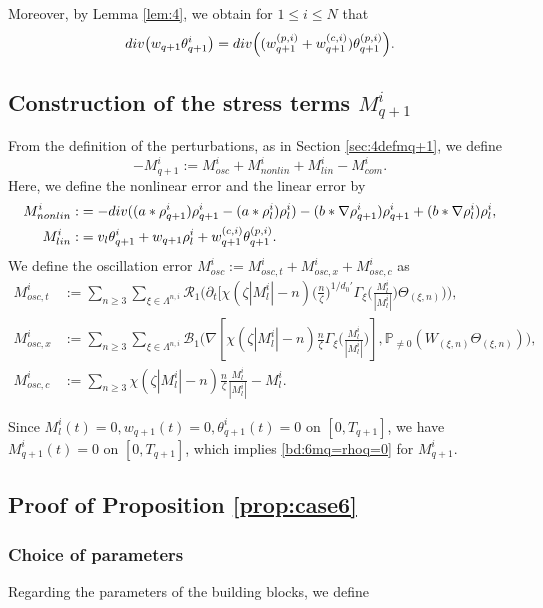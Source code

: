 \documentclass[10pt,a4paper]{amsart}
\numberwithin{equation}{section}
\def\({{\Big(}}
\def\){{\Big)}}
\def\geq{\geqslant}
\def\leq{\leqslant}
\def\div{\mathord{{\rm div}}}
\def\({{\Big(}}
\def\){{\Big)}}
\def\geq{\geqslant}
\def\leq{\leqslant}
\def\div{\mathord{{\rm div}}}
\begin{document}
Moreover, by Lemma \ref{lem:4}, we obtain for
$
1\leq i\leq N 
$
that
\begin{align}
\div\bigl(
w_{q+1}\theta_{q+1}^i
\bigr)
=
\div\(
(w_{q+1}^{(p,i)}+w_{q+1}^{(c,i)})
\theta_{q+1}^{(p,i)}
\).\notag
\end{align}


\subsection{Construction of the stress terms $M^{i}_{q+1}$}\label{sec:6defmq+1}

From  the definition of the perturbations, as in Section \ref{sec:4defmq+1},  
we   define 
 $$-{M}^i_{q+1}:=M^{i}_{osc}+M^{i}_{nonlin}+M^{i}_{lin}-M_{com}^i.$$
 Here, we define the nonlinear error and the linear error   by
\begin{align*} 
M^{i}_{nonlin}:&= -\div( (a*\rho^{i}_{q+1}) \rho^{i}_{q+1}-(a*\rho^{i}_{l}) \rho^{i}_{l} )-(b*\nabla\rho_{q+1}^i)\rho_{q+1}^i+(b*\nabla\rho_{l}^i)\rho_{l}^i,\\
M^{i}_{lin}:&=v_l\theta^{i}_{q+1}+w_{q+1}\rho^{i}_l+w_{q+1}^{(c,i)}\theta_{q+1}^{(p,i)}.
\end{align*}
 We define the oscillation error  $M^{i}_{osc}:=M^{i}_{osc,t}+M^{i}_{osc,x}+M^{i}_{osc,c}$ as
\begin{align*}
   M^{i}_{osc,t}&:=\sum_{n\geq3}\sum_{\xi\in\Lambda^{n,i}}\mathcal{R}_{1}\(\partial_t[\chi(\zeta|M^{i}_l|-n)\(\frac{n}{\zeta}\)^{1/d_0'}\Gamma_{\xi}\(\frac{M^{i}_l}{|M^{i}_l|}\)\Theta_{(\xi,n)})\),\\
M^{i}_{osc,x}&:=\sum_{n\geq3}\sum_{\xi\in\Lambda^{n,i}}\mathcal{B}_{1}\(\nabla[\chi(\zeta|M^{i}_l|-n)\frac{n}{\zeta}\Gamma_{\xi}\(\frac{M^{i}_l}{|M^{i}_l|}\)],\mathbb{P}_{\neq0}(W_{(\xi,n)}\Theta_{(\xi,n)})\),\\
   M^{i}_{osc,c}&:=\sum_{n\geq3}\chi(\zeta|M^{i}_l|-n)\frac{n}{\zeta}\frac{M^{i}_l}{|M^{i}_l|}- M^{i}_l.
\end{align*}
 
Since $M^{i}_l(t)=0,w_{q+1}(t)=0,\theta^i_{q+1}(t)=0$ on $[0,T_{q+1}]$,  we have $M_{q+1}^i(t)=0$ on $[0,T_{q+1}]$, which implies  \eqref{bd:6mq=rhoq=0} for $M_{q+1}^i$. 


\subsection{ Proof of Proposition \ref{prop:case6}}   
\subsubsection{Choice of parameters} 
Regarding the parameters of the building blocks, we define
  
\end{document}
